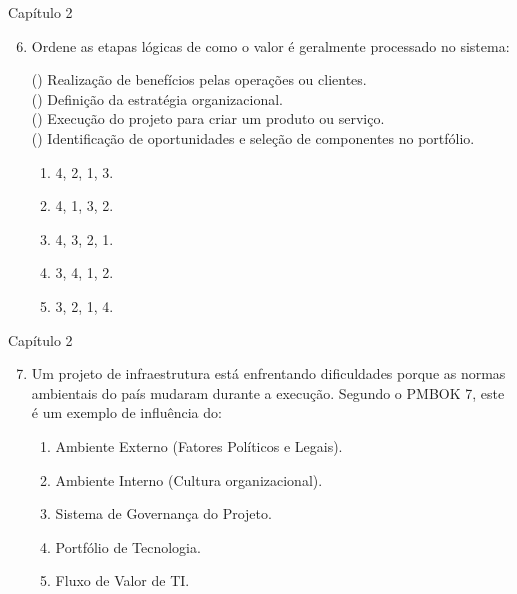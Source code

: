 \documentclass{beamer}
\begin{document}
\begin{frame}{Capítulo 2}
	\begin{enumerate}
		\setcounter{enumi}{5}
		\justifying
		\item Ordene as etapas lógicas de como o valor é geralmente processado no sistema:
		
		(\hspace{10pt}) Realização de benefícios pelas operações ou clientes.\\
		(\hspace{10pt}) Definição da estratégia organizacional.\\
		(\hspace{10pt}) Execução do projeto para criar um produto ou serviço.\\
		(\hspace{10pt}) Identificação de oportunidades e seleção de componentes no portfólio.
		
		\begin{enumerate}[a]
			\item 4, 2, 1, 3.
			\item \alert<2>{4, 1, 3, 2}.
			\item 4, 3, 2, 1.
			\item 3, 4, 1, 2.
			\item 3, 2, 1, 4.
		\end{enumerate}
	\end{enumerate}
\end{frame}

\begin{frame}{Capítulo 2}
	\begin{enumerate}
		\setcounter{enumi}{6}
		\justifying
		\item Um projeto de infraestrutura está enfrentando dificuldades porque as normas ambientais do país mudaram durante a execução. Segundo o PMBOK 7, este é um exemplo de influência do:
		\begin{enumerate}[a]
			\justifying
			\item \alert<2>{Ambiente Externo (Fatores Políticos e Legais)}.
			\item Ambiente Interno (Cultura organizacional).
			\item Sistema de Governança do Projeto.
			\item Portfólio de Tecnologia.
			\item Fluxo de Valor de TI.
		\end{enumerate}
	\end{enumerate}
\end{frame}
\end{document}
